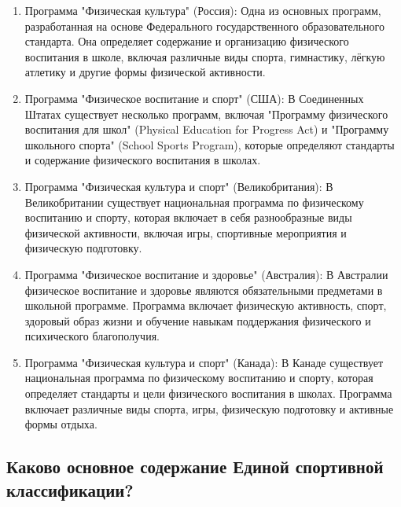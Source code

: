 \begin{enumerate}
    \item Программа "Физическая культура" (Россия): Одна из основных программ, разработанная на основе Федерального государственного образовательного стандарта. Она определяет содержание и организацию физического воспитания в школе, включая различные виды спорта, гимнастику, лёгкую атлетику и другие формы физической активности.
    \item Программа "Физическое воспитание и спорт" (США): В Соединенных Штатах существует несколько программ, включая "Программу физического воспитания для школ" (Physical Education for Progress Act) и "Программу школьного спорта" (School Sports Program), которые определяют стандарты и содержание физического воспитания в школах.
    \item Программа "Физическая культура и спорт" (Великобритания): В Великобритании существует национальная программа по физическому воспитанию и спорту, которая включает в себя разнообразные виды физической активности, включая игры, спортивные мероприятия и физическую подготовку.
    \item Программа "Физическое воспитание и здоровье" (Австралия): В Австралии физическое воспитание и здоровье являются обязательными предметами в школьной программе. Программа включает физическую активность, спорт, здоровый образ жизни и обучение навыкам поддержания физического и психического благополучия.
    \item Программа "Физическая культура и спорт" (Канада): В Канаде существует национальная программа по физическому воспитанию и спорту, которая определяет стандарты и цели физического воспитания в школах. Программа включает различные виды спорта, игры, физическую подготовку и активные формы отдыха.
\end{enumerate}

\subsection{Каково основное содержание Единой спортивной классификации?}

